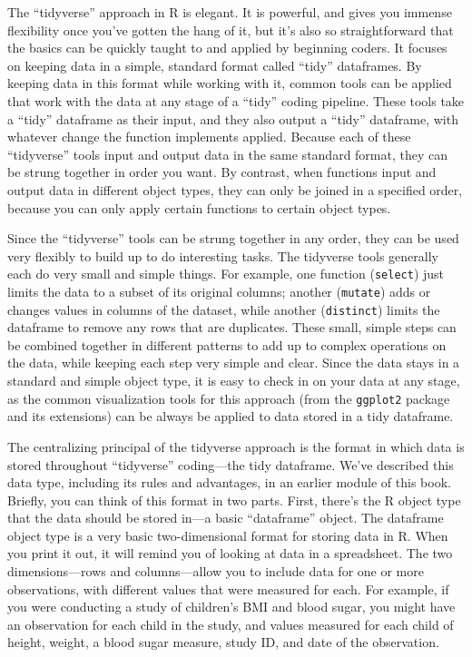 \documentclass[]{tufte-book}
\begin{document}
The ``tidyverse'' approach in R is elegant. It is powerful, and gives you immense
flexibility once you've gotten the hang of it, but it's also so straightforward
that the basics can be quickly taught to and applied by beginning coders. It
focuses on keeping data in a simple, standard format called ``tidy'' dataframes.
By keeping data in this format while working with it, common tools can be applied
that work with the data at any stage of a ``tidy'' coding pipeline. These tools take
a ``tidy'' dataframe as their input, and they also output a ``tidy'' dataframe, with
whatever change the function implements applied. Because each of these ``tidyverse''
tools input and output data in the same standard format, they can be strung together
in order you want. By contrast, when functions input and output data in different
object types, they can only be joined in a specified order, because you can only
apply certain functions to certain object types.

Since the ``tidyverse'' tools can be strung together in any order, they can be
used very flexibly to build up to do interesting tasks. The tidyverse tools
generally each do very small and simple things. For example, one function
(\texttt{select}) just limits the data to a subset of its original columns; another
(\texttt{mutate}) adds or changes values in columns of the dataset, while another
(\texttt{distinct}) limits the dataframe to remove any rows that are duplicates. These
small, simple steps can be combined together in different patterns to add up to
complex operations on the data, while keeping each step very simple and clear.
Since the data stays in a standard and simple object type, it is easy to check
in on your data at any stage, as the common visualization tools for this
approach (from the \texttt{ggplot2} package and its extensions) can be always be
applied to data stored in a tidy dataframe.

The centralizing principal of the tidyverse approach is the format in which data
is stored throughout ``tidyverse'' coding---the tidy dataframe. We've described
this data type, including its rules and advantages, in an earlier module of this
book. Briefly, you can think of this format in two parts. First, there's the R
object type that the data should be stored in---a basic ``dataframe'' object. The
dataframe object type is a very basic two-dimensional format for storing data in
R. When you print it out, it will remind you of looking at data in a
spreadsheet. The two dimensions---rows and columns---allow you to include data
for one or more observations, with different values that were measured for each.
For example, if you were conducting a study of children's BMI and blood sugar,
you might have an observation for each child in the study, and values measured
for each child of height, weight, a blood sugar measure, study ID, and date of
the observation.
\end{document}
